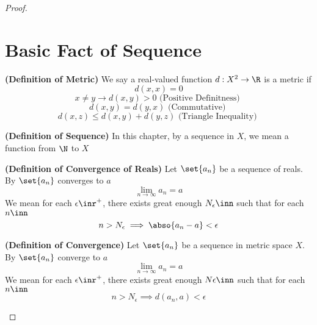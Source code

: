 \documentclass{report}
\begin{document}
\begin{proof}
\section{Basic Fact of Sequence}
\begin{definition}
\label{3.1.1}
\textbf{(Definition of Metric)} We say a real-valued function $d:X^2\rightarrow \R$ is a metric if
\begin{equation*}
d(x,x)=0 
\end{equation*}
\begin{equation*}
x\neq y\longrightarrow d(x,y)>0\text{ (Positive Definitness) }
\end{equation*}
\begin{equation*}
d(x,y)=d(y,x)\text{ (Commutative) }
\end{equation*}
\begin{equation*}
d(x,z)\leq d(x,y)+d(y,z)\text{ (Triangle Inequality) }
\end{equation*}
\end{definition}
\begin{definition}
\label{3.1.2}
\textbf{(Definition of Sequence)} In this chapter, by a sequence in $X$, we mean a function from  $\N$ to  $X$
\end{definition}
\begin{definition}
\label{3.1.3}
\textbf{(Definition of Convergence of Reals)} Let $\set{a_n}$ be a sequence of reals. By $\set{a_n}$ converges to $a$ 
\begin{equation*}
\lim_{n\to\infty} a_n=a
\end{equation*}
We mean for each $\epsilon \inr^+$, there exists great enough $N_\epsilon \inn$  such that for each $n\inn$ 
\begin{equation*}
n>N_\epsilon \implies \abso{a_n-a}<\epsilon 
\end{equation*}
\end{definition}
\begin{definition}
\label{3.1.4}
\textbf{(Definition of Convergence)} Let $\set{a_n}$ be a sequence in metric space $X$. By $\set{a_n}$ converge to $a$
\begin{equation*}
\lim_{n\to\infty}a_n=a
\end{equation*}
We mean for each $\epsilon \inr^+$, there exists great enough $N\epsilon \inn$ such that for each $n\inn$
 \begin{equation*}
n>N_\epsilon \implies d(a_n,a)<\epsilon 

\end{equation*}
\end{definition}
\end{proof}
\end{document}
